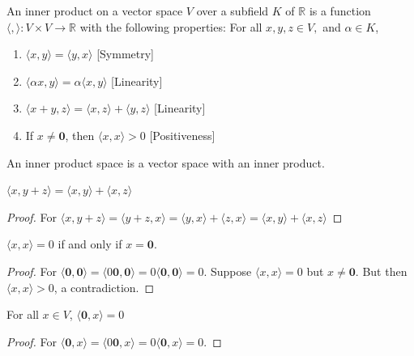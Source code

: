 \documentclass[crop=false,class=book,oneside]{standalone}
\begin{document}
            \begin{definition}
            An inner product on a vector space $V$ over a subfield $K$ of $\mathbb{R}$ is a function $\langle , \rangle:V\times V\rightarrow \mathbb{R}$ with the following properties: For all $x,y,z \in V,$ and $\alpha \in K$,
            \begin{enumerate}
                \item $\langle x,y \rangle = \langle y,x \rangle$ \hfill [Symmetry]
                \item $\langle \alpha x, y \rangle = \alpha \langle x,y \rangle$ \hfill [Linearity]
                \item $\langle x+y,z \rangle = \langle x,z\rangle + \langle y,z \rangle$ \hfill [Linearity]
                \item  If $x\ne \mathbf{0}$, then $\langle x,x\rangle >0$ \hfill [Positiveness]
            \end{enumerate}
            \end{definition}
            \begin{definition}
            An inner product space is a vector space with an inner product.
            \end{definition}
            \begin{theorem}
            $\langle x,y+z\rangle=\langle x,y\rangle+\langle x,z\rangle$
            \end{theorem}
            \begin{proof}
            For $\langle x,y+z\rangle=\langle y+z,x\rangle=\langle y,x\rangle+\langle z,x\rangle=\langle x,y\rangle+\langle x,z\rangle$
            \end{proof}
            \begin{theorem}
            $\langle x,x \rangle = 0$ if and only if $x= \mathbf{0}$.
            \end{theorem}
            \begin{proof}
            For $\langle \mathbf{0}, \mathbf{0} \rangle = \langle 0\mathbf{0},\mathbf{0} \rangle = 0 \langle \mathbf{0},\mathbf{0}\rangle = 0$. Suppose $\langle x,x \rangle =0$ but $x\ne \mathbf{0}$. But then $\langle x,x \rangle >0$, a contradiction.
            \end{proof}
            \begin{corollary}
            For all $x\in V$, $\langle \mathbf{0},x \rangle = 0$
            \end{corollary}
            \begin{proof}
            For $\langle \mathbf{0}, x\rangle = \langle 0\mathbf{0},x \rangle = 0\langle \mathbf{0},x\rangle = 0$.
            \end{proof}
\end{document}
